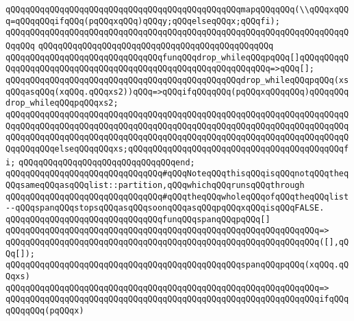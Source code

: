 \verb|qQQqqQQqqQQqqQQqqQQqqQQqqQQqqQQqqQQqqQQqqQQqqQQqmapqQQqqQQq(\\qQQqxqQQq=qQQqqQQqifqQQq(pqQQqxqQQq)qQQqy;qQQqelseqQQqx;qQQqfi);|\newline
\verb|qQQqqQQqqQQqqQQqqQQqqQQqqQQqqQQqqQQqqQQqqQQqqQQqqQQqqQQqqQQqqQQqqQQqqQQqqQQq|\newline
\verb|qQQqqQQqqQQqqQQqqQQqqQQqqQQqqQQqqQQqqQQqqQQqqQQq|\newline
\verb|qQQqqQQqqQQqqQQqqQQqqQQqqQQqqQQqfunqQQqdrop_whileqQQqpqQQq[]qQQqqQQqqQQqqQQqqQQqqQQqqQQqqQQqqQQqqQQqqQQqqQQqqQQqqQQqqQQqqQQq=>qQQq[];|\newline
\verb|qQQqqQQqqQQqqQQqqQQqqQQqqQQqqQQqqQQqqQQqqQQqqQQqdrop_whileqQQqpqQQq(xsqQQqasqQQq(xqQQq.qQQqxs2))qQQq=>qQQqifqQQqqQQq(pqQQqxqQQqqQQq)qQQqqQQqdrop_whileqQQqpqQQqxs2;|\newline
\verb|qQQqqQQqqQQqqQQqqQQqqQQqqQQqqQQqqQQqqQQqqQQqqQQqqQQqqQQqqQQqqQQqqQQqqQQqqQQqqQQqqQQqqQQqqQQqqQQqqQQqqQQqqQQqqQQqqQQqqQQqqQQqqQQqqQQqqQQqqQQqqQQqqQQqqQQqqQQqqQQqqQQqqQQqqQQqqQQqqQQqqQQqqQQqqQQqqQQqqQQqqQQqqQQqqQQqqQQqqQQqelseqQQqqQQqxs;qQQqqQQqqQQqqQQqqQQqqQQqqQQqqQQqqQQqqQQqqQQqfi;|\newline
\verb|qQQqqQQqqQQqqQQqqQQqqQQqqQQqqQQqend;|\newline
\newline
\newline
\verb|qQQqqQQqqQQqqQQqqQQqqQQqqQQqqQQq#qQQqNoteqQQqthisqQQqisqQQqnotqQQqtheqQQqsameqQQqasqQQqlist::partition,qQQqwhichqQQqrunsqQQqthrough|\newline
\verb|qQQqqQQqqQQqqQQqqQQqqQQqqQQqqQQq#qQQqtheqQQqwholeqQQqofqQQqtheqQQqlist--qQQqspanqQQqstopsqQQqasqQQqsoonqQQqasqQQqpqQQqxqQQqisqQQqFALSE.|\newline
\newline
\verb|qQQqqQQqqQQqqQQqqQQqqQQqqQQqqQQqfunqQQqspanqQQqpqQQq[]|\newline
\verb|qQQqqQQqqQQqqQQqqQQqqQQqqQQqqQQqqQQqqQQqqQQqqQQqqQQqqQQqqQQqqQQq=>|\newline
\verb|qQQqqQQqqQQqqQQqqQQqqQQqqQQqqQQqqQQqqQQqqQQqqQQqqQQqqQQqqQQqqQQq([],qQQq[]);|\newline
\newline
\verb|qQQqqQQqqQQqqQQqqQQqqQQqqQQqqQQqqQQqqQQqqQQqqQQqspanqQQqpqQQq(xqQQq.qQQqxs)|\newline
\verb|qQQqqQQqqQQqqQQqqQQqqQQqqQQqqQQqqQQqqQQqqQQqqQQqqQQqqQQqqQQqqQQq=>|\newline
\verb|qQQqqQQqqQQqqQQqqQQqqQQqqQQqqQQqqQQqqQQqqQQqqQQqqQQqqQQqqQQqqQQqifqQQqqQQqqQQq(pqQQqx)|\newline
